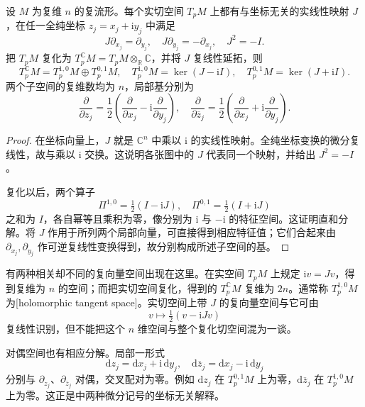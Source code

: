 \begin{proposition}[切空间上的复结构]\label{b3:prop:29-complex-tangent}
设 \(M\) 为复维 \(n\) 的复流形。每个实切空间 \(T_pM\) 上都有与坐标无关的实线性映射 \(J\)，在任一全纯坐标 \(z_j=x_j+\mathrm{i}y_j\) 中满足
\[
 J\partial_{x_j}=\partial_{y_j},
 \quad J\partial_{y_j}=-\partial_{x_j},
 \quad J^2=-I.
\]
把 \(T_pM\) 复化为 \(T_p^{\mathbb C}M=T_pM\otimes_{\mathbb R}\mathbb C\)，并将 \(J\) 复线性延拓，则
\begin{equation}\label{b3:eq:29-tangent-types}
 T_p^{\mathbb C}M=T_p^{1,0}M\oplus T_p^{0,1}M,
 \quad
 T_p^{1,0}M=\ker(J-\mathrm{i}I),
 \quad T_p^{0,1}M=\ker(J+\mathrm{i}I).
\end{equation}
两个子空间的复维数均为 \(n\)，局部基分别为
\[
 \frac\partial{\partial z_j}
 =\frac12\left(\frac\partial{\partial x_j}
                -\mathrm{i}\frac\partial{\partial y_j}\right),
 \quad
 \frac\partial{\partial\overline z_j}
 =\frac12\left(\frac\partial{\partial x_j}
                +\mathrm{i}\frac\partial{\partial y_j}\right).
\]
\end{proposition}
\begin{proof}
在坐标向量上，\(J\) 就是 \(\mathbb C^n\) 中乘以 \(\mathrm{i}\) 的实线性映射。全纯坐标变换的微分复线性，故与乘以 \(\mathrm{i}\) 交换。这说明各张图中的 \(J\) 代表同一个映射，并给出 \(J^2=-I\)。

复化以后，两个算子
\[
 \Pi^{1,0}=\tfrac12(I-\mathrm{i}J),
 \quad \Pi^{0,1}=\tfrac12(I+\mathrm{i}J)
\]
之和为 \(I\)，各自幂等且乘积为零，像分别为 \(\mathrm{i}\) 与 \(-\mathrm{i}\) 的特征空间。这证明直和分解。将 \(J\) 作用于所列两个局部向量，可直接得到相应特征值；它们合起来由 \(\partial_{x_j},\partial_{y_j}\) 作可逆复线性变换得到，故分别构成所述子空间的基。
\end{proof}

有两种相关却不同的复向量空间出现在这里。在实空间 \(T_pM\) 上规定 \(\mathrm{i}v=Jv\)，得到复维为 \(n\) 的空间；而把实切空间复化，得到的 \(T_p^{\mathbb C}M\) 复维为 \(2n\)。通常称 \(T_p^{1,0}M\) 为[holomorphic tangent space]。实切空间上带 \(J\) 的复向量空间与它可由
\[
 v\longmapsto\tfrac12(v-\mathrm{i}Jv)
\]
复线性识别，但不能把这个 \(n\) 维空间与整个复化切空间混为一谈。

\ProseParagraphBreak

对偶空间也有相应分解。局部一形式
\[
 \mathrm{d}z_j=\mathrm{d}x_j+\mathrm{i}\,\mathrm{d}y_j,
 \quad
 \mathrm{d}\overline z_j=\mathrm{d}x_j-\mathrm{i}\,\mathrm{d}y_j
\]
分别与 \(\partial_{z_j}\)、\(\partial_{\overline z_j}\) 对偶，交叉配对为零。例如 \(\mathrm{d}z_j\) 在 \(T_p^{0,1}M\) 上为零，\(\mathrm{d}\overline z_j\) 在 \(T_p^{1,0}M\) 上为零。这正是中两种微分记号的坐标无关解释。

